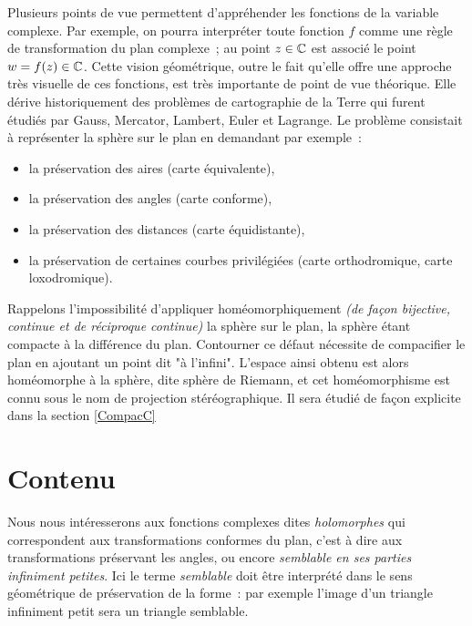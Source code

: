 Plusieurs points de vue permettent d'appréhender les fonctions de la variable complexe. Par exemple, on pourra interpréter toute fonction $f$ comme une règle de transformation du plan complexe~; au point $z \in \mathbb{C}$ est associé le point $w = f(z) \in \mathbb{C}$. Cette vision géométrique, outre le fait qu'elle offre une approche très visuelle de ces fonctions, est très importante de point de vue théorique. Elle dérive historiquement des problèmes de cartographie de la Terre qui furent étudiés par Gauss, Mercator, Lambert, Euler et Lagrange. Le problème consistait à représenter la sphère sur le plan en demandant par exemple~:
\begin{itemize}
    \item la préservation des aires (carte équivalente), 
    \item la préservation des angles (carte conforme), 
    \item la préservation des distances (carte équidistante),
    \item la préservation de certaines courbes privilégiées (carte orthodromique, carte loxodromique).
\end{itemize} 
\vspace{0.1in} 

Rappelons l'impossibilité d'appliquer homéomorphiquement \textit{(de façon bijective, continue et de réciproque continue)} la sphère sur le plan, la sphère étant compacte à la différence du plan. Contourner ce défaut nécessite de compacifier le plan en ajoutant un point dit "à l'infini". L'espace ainsi obtenu est alors homéomorphe à la sphère, dite sphère de Riemann, et cet homéomorphisme est connu sous le nom de projection stéréographique. Il sera étudié de façon explicite dans la section \ref{CompacC}





\section{Contenu}
Nous nous intéresserons aux fonctions complexes dites \emph{holomorphes} qui correspondent aux transformations conformes du plan, c'est à dire aux transformations préservant les angles, ou encore \emph{semblable en ses parties infiniment petites}. Ici le terme \emph{semblable} doit être interprété dans le sens géométrique de préservation de la forme~: par exemple l'image d'un triangle infiniment petit sera un triangle semblable.
\vspace{0.1in} 

